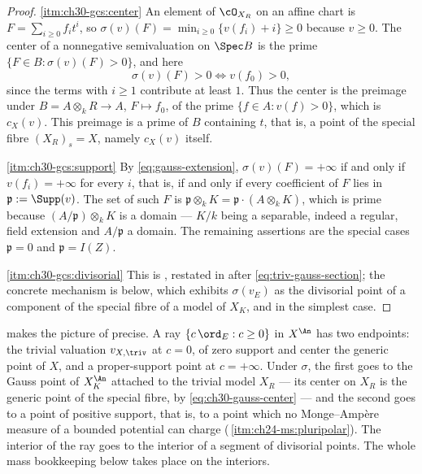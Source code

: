 \begin{proof}
\cref{itm:ch30-gcs:center}  An element of \(\cO_{X_R}\) on an affine chart is
\(F=\sum_{i\geq0}f_it^i\), so
\(\sigma(v)(F)=\min_{i\geq0}\{v(f_i)+i\}\geq0\) because \(v\geq0\).  The
center of a nonnegative semivaluation on \(\Spec B\) is the prime
\(\{F\in B:\sigma(v)(F)>0\}\), and here
\[
 \sigma(v)(F)>0
 \iff v(f_0)>0,
\]
since the terms with \(i\geq1\) contribute at least \(1\).  Thus the center
is the preimage under \(B=A\otimes_kR\to A\), \(F\mapsto f_0\), of the prime
\(\{f\in A:v(f)>0\}\), which is \(c_X(v)\).  This preimage is a prime of
\(B\) containing \(t\), that is, a point of the special fibre
\((X_R)_s=X\), namely \(c_X(v)\) itself.

\cref{itm:ch30-gcs:support}  By \eqref{eq:gauss-extension},
\(\sigma(v)(F)=+\infty\) if and only if \(v(f_i)=+\infty\) for every \(i\),
that is, if and only if every coefficient of \(F\) lies in
\(\mathfrak p:=\Supp(v)\).  The set of such \(F\) is
\(\mathfrak p\otimes_kK=\mathfrak p\cdot(A\otimes_kK)\), which is prime
because \((A/\mathfrak p)\otimes_kK\) is a domain --- \(K/k\) being a
separable, indeed a regular, field extension and \(A/\mathfrak p\) a
domain.  The remaining assertions are the special cases
\(\mathfrak p=0\) and \(\mathfrak p=I(Z)\).

\cref{itm:ch30-gcs:divisorial}  This is
\cite[\S1]{BJ22}, restated in  after
\eqref{eq:triv-gauss-section}; the concrete mechanism is
 below, which exhibits \(\sigma(v_E)\)
as the divisorial point of a component of the special fibre of a model of
\(X_K\), and  in the simplest case.
\end{proof}

\begin{remark}
\label{rem:ch30-gauss-ray-endpoints}
 makes the picture of
 precise.  A ray \(\{c\,\ord_E:c\geq0\}\) in
\(X^{\An}\) has two endpoints: the trivial valuation \(v_{X,\triv}\) at
\(c=0\), of zero support and center the generic point of \(X\), and a
proper-support point at \(c=+\infty\).  Under \(\sigma\), the first goes to
the Gauss point of \(X_K^{\An}\) attached to the trivial model \(X_R\) ---
its center on \(X_R\) is the generic point of the special fibre, by
\eqref{eq:ch30-gauss-center} --- and the second goes to a point of positive
support, that is, to a point which no Monge--Amp\`ere measure of a bounded
potential can charge
(\,\cref{itm:ch24-ms:pluripolar}).  The
interior of the ray goes to the interior of a segment of divisorial points.
The whole mass bookkeeping below takes place on the interiors.
\end{remark}

